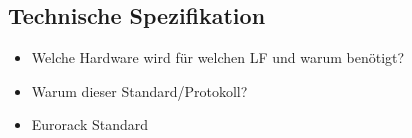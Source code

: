 \newpage
\subsection{Technische Spezifikation}
\begin{itemize}
    \item Welche Hardware wird für welchen LF und warum benötigt?
    \item Warum dieser Standard/Protokoll?
    \item Eurorack Standard
\end{itemize}